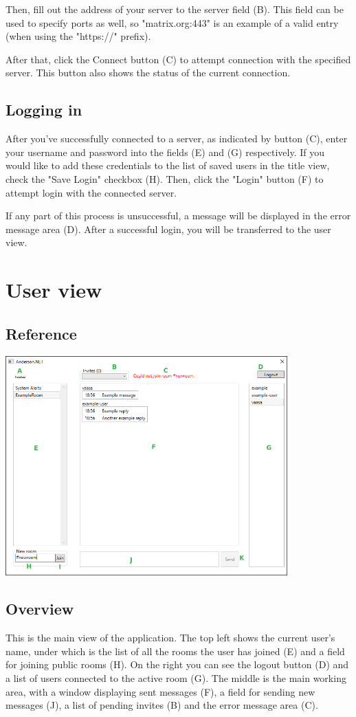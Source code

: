 \documentclass[titlepage]{scrartcl}
\begin{document}
Then, fill out the address of your server to the server field (B). This field can be used to specify ports as well, so "matrix.org:443" is an example of a valid entry (when using the "https://" prefix). 

After that, click the Connect button (C) to attempt connection with the specified server. This button also shows the status of the current connection.

\subsection{Logging in}
After you've successfully connected to a server, as indicated by button (C), enter your username and password into the fields (E) and (G) respectively. If you would like to add these credentials to the list of saved users in the title view, check the "Save Login" checkbox (H). Then, click the "Login" button (F) to attempt login with the connected server.

If any part of this process is unsuccessful, a message will be displayed in the error message area (D). After a successful login, you will be transferred to the user view.

\section{User view}
\subsection{Reference}
\begin{center}
    \includegraphics[width=410px]{user-window.png}
\end{center}

\subsection{Overview}
This is the main view of the application. The top left shows the current user's name, under which is the list of all the rooms the user has joined (E) and a field for joining public rooms (H). On the right you can see the logout button (D) and a list of users connected to the active room (G). The middle is the main working area, with a window displaying sent messages (F), a field for sending new messages (J), a list of pending invites (B) and the error message area (C).
\end{document}
